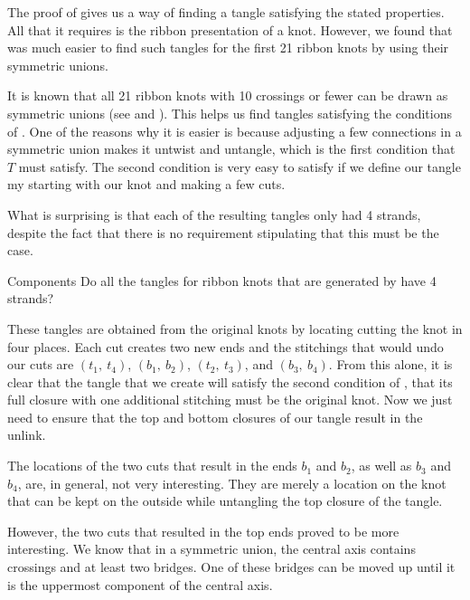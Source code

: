 \begin{paper}

The proof of \thmRibbon gives us a way of finding a tangle satisfying the stated
properties.
All that it requires is the ribbon presentation of a knot.
However, we found that was much easier to find such tangles for the first 21
ribbon knots by using their symmetric unions.

It is known that all 21 ribbon knots with 10 crossings or fewer can be drawn as
symmetric unions (see \cite{many} and \cite{one}).
This helps us find tangles satisfying the conditions of \thmRibbon.
One of the reasons why it is easier is because adjusting a few connections in a
symmetric union makes it untwist and untangle, which is the first condition that
$T$ must satisfy.
The second condition is very easy to satisfy if we define our tangle my starting
with our knot and making a few cuts.

What is surprising is that each of the resulting tangles only had 4 strands,
despite the fact that there is no requirement stipulating that this must be the
case.

\begin{paperqtn}{Components}
Do all the tangles for ribbon knots that are generated by \thmRibbon have 4
strands?
\end{paperqtn}

These tangles are obtained from the original knots by locating cutting the knot
in four places.
Each cut creates two new ends and the stitchings that would undo our cuts are
$(t_1,~t_4)$, $(b_1,~b_2)$, $(t_2,~t_3)$, and $(b_3,~b_4)$.
From this alone, it is clear that the tangle that we create will satisfy the
second condition of \thmRibbon, that its full closure with one additional
stitching must be the original knot.
Now we just need to ensure that the top and bottom closures of our tangle
result in the unlink.

The locations of the two cuts that result in the ends $b_1$ and $b_2$, as well
as $b_3$ and $b_4$, are, in general, not very interesting.
They are merely a location on the knot that can be kept on the outside while
untangling the top closure of the tangle.

However, the two cuts that resulted in the top ends proved to be more
interesting.
We know that in a symmetric union, the central axis contains crossings and at
least two bridges.
One of these bridges can be moved up until it is the uppermost component of the
central axis.\newsavebox{\knotR}


\end{paper}
